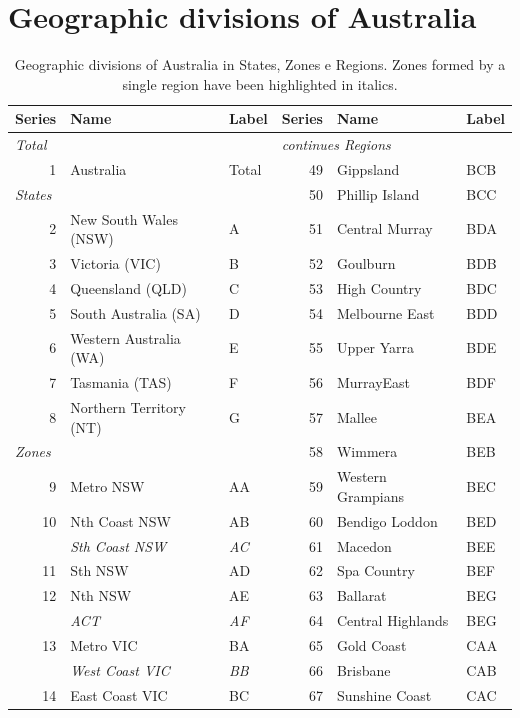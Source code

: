 \documentclass[a4paper,11pt]{article}
\theoremstyle{definition}
\begin{document}
\newpage

\section{Geographic divisions of Australia}
\label{app:australia}
\begin{table}[H]
	\caption{Geographic divisions of Australia in States, Zones e Regions. Zones formed by a single region have been highlighted in italics.}
	\label{tab:australia}
	\fontsize{9}{10}\selectfont
	\centering
	\begin{tabular}{r l l|r l l}
		\toprule
		\textbf{Series} & \textbf{Name}&\textbf{Label} & \textbf{Series} & \textbf{Name}&\textbf{Label}\\
		\midrule
		\multicolumn{1}{l}{\textit{Total}}&&&\multicolumn{3}{l|}{\textit{continues Regions}} \\
		1&Australia&Total& 49& Gippsland &BCB\\
		\cline{1-3}
		\multicolumn{1}{l}{\textit{States}} &&& 50 &Phillip Island& BCC\\
		2 &New South Wales (NSW)& A&51 &Central Murray &BDA\\
		3 &Victoria (VIC) & B&52 &Goulburn& BDB \\
		4 &Queensland (QLD) &C &53 &High Country& BDC\\
		5 &South Australia (SA) &D &54 &Melbourne East& BDD\\
		6 &Western Australia (WA) &E &55& Upper Yarra &BDE\\
		7 &Tasmania (TAS) &F & 56& MurrayEast &BDF\\
		8 &Northern Territory (NT) &G&57 &Mallee& BEA \\
		\cline{1-3}
		\multicolumn{1}{l}{\textit{Zones}} &&&58 &Wimmera& BEB \\
		9 &Metro NSW &AA &59 &Western Grampians &BEC\\
		10 &Nth Coast NSW &AB &60& Bendigo Loddon &BED\\
		& \textit{Sth Coast NSW} & \textit{AC} & 61& Macedon& BEE\\
		11 &Sth NSW &AD &62& Spa Country& BEF\\
		12 &Nth NSW &AE& 63& Ballarat &BEG\\
		&\textit{ACT} &\textit{AF} &64& Central Highlands &BEG\\
		13 &Metro VIC& BA &65& Gold Coast& CAA\\
		&\textit{West Coast VIC}& \textit{BB}& 66 &Brisbane &CAB\\
		14 &East Coast VIC &BC& 67& Sunshine Coast &CAC\\

\end{tabular}
\end{table}
\end{document}
